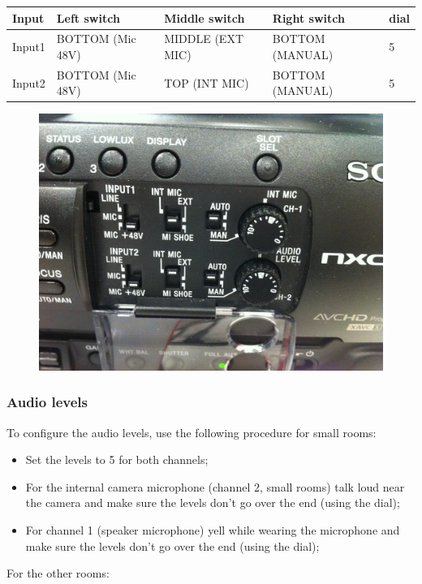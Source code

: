 \documentclass{article}
\begin{document}
\begin{tabular}{| l || l | l | l | l |}
Input & Left switch & Middle switch & Right switch & dial \\ \hline
Input1 & BOTTOM (Mic 48V) & MIDDLE (EXT MIC) & BOTTOM (MANUAL) & 5 \\
Input2 & BOTTOM (Mic 48V) & TOP (INT MIC) & BOTTOM (MANUAL) & 5 \\
\end{tabular}

\begin{figure}[H]
  \centering
\includegraphics[width = 120mm]{sony_audio_settings.jpg}
\end{figure}

\subsubsection{Audio levels}

To configure the audio levels, use the following procedure for small rooms:
\begin{itemize}
  \item Set the levels to 5 for both channels;
  \item For the internal camera microphone (channel 2, small rooms) talk loud near the camera and make sure the levels don't go over the end (using the dial);
  \item For channel 1 (speaker microphone) yell while wearing the microphone and make sure the levels don't go over the end (using the dial);
\end{itemize}

For the other rooms:
\end{document}
